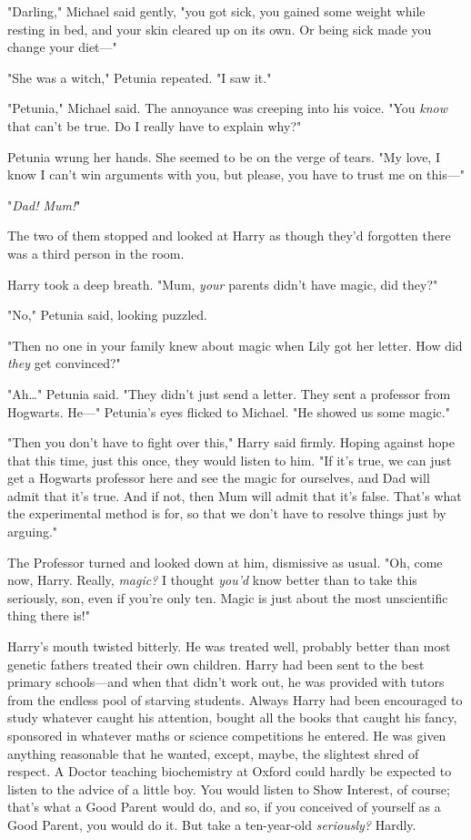 "Darling," Michael said gently, "you got sick, you gained some weight while 
resting in bed, and your skin cleared up on its own. Or being sick made you 
change your diet---"

"She was a witch," Petunia repeated. "I saw it."

"Petunia," Michael said. The annoyance was creeping into his voice. "You 
\emph{know} that can't be true. Do I really have to explain why?"

Petunia wrung her hands. She seemed to be on the verge of tears. "My love, I 
know I can't win arguments with you, but please, you have to trust me on 
this---"

"\emph{Dad! Mum!}"

The two of them stopped and looked at Harry as though they'd forgotten there 
was a third person in the room.

Harry took a deep breath. "Mum, \emph{your} parents didn't have magic, did 
they?"

"No," Petunia said, looking puzzled.

"Then no one in your family knew about magic when Lily got her letter. How did 
\emph{they} get convinced?"

"Ah{\ldots}" Petunia said. "They didn't just send a letter. They sent a 
professor from Hogwarts. He---" Petunia's eyes flicked to Michael. "He showed 
us some magic."

"Then you don't have to fight over this," Harry said firmly. Hoping against 
hope that this time, just this once, they would listen to him. "If it's true, 
we can just get a Hogwarts professor here and see the magic for ourselves, and 
Dad will admit that it's true. And if not, then Mum will admit that it's false. 
That's what the experimental method is for, so that we don't have to resolve 
things just by arguing."

The Professor turned and looked down at him, dismissive as usual. "Oh, come 
now, Harry. Really, \emph{magic?} I thought \emph{you'd} know better than to 
take this seriously, son, even if you're only ten. Magic is just about the most 
unscientific thing there is!"

Harry's mouth twisted bitterly. He was treated well, probably better than most 
genetic fathers treated their own children. Harry had been sent to the best 
primary schools---and when that didn't work out, he was provided with tutors 
from the endless pool of starving students. Always Harry had been encouraged to 
study whatever caught his attention, bought all the books that caught his 
fancy, sponsored in whatever maths or science competitions he entered. He was 
given anything reasonable that he wanted, except, maybe, the slightest shred of 
respect. A Doctor teaching biochemistry at Oxford could hardly be expected to 
listen to the advice of a little boy. You would listen to Show Interest, of 
course; that's what a Good Parent would do, and so, if you conceived of 
yourself as a Good Parent, you would do it. But take a ten-year-old 
\emph{seriously?} Hardly.


